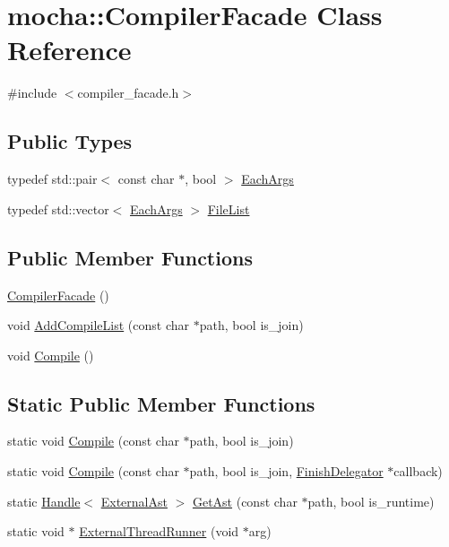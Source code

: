 \hypertarget{classmocha_1_1_compiler_facade}{
\section{mocha::CompilerFacade Class Reference}
\label{classmocha_1_1_compiler_facade}
}


{\ttfamily \#include $<$compiler\_\-facade.h$>$}

\subsection*{Public Types}
\begin{DoxyCompactItemize}
\item 
typedef std::pair$<$ const char $\ast$, bool $>$ \hyperlink{classmocha_1_1_compiler_facade_a22a27bcd738fd453a4da03982f96a080}{EachArgs}
\item 
typedef std::vector$<$ \hyperlink{classmocha_1_1_compiler_facade_a22a27bcd738fd453a4da03982f96a080}{EachArgs} $>$ \hyperlink{classmocha_1_1_compiler_facade_a8b5aaa05b5213622382bbd292a460461}{FileList}
\end{DoxyCompactItemize}
\subsection*{Public Member Functions}
\begin{DoxyCompactItemize}
\item 
\hyperlink{classmocha_1_1_compiler_facade_af1150ae9139adff6c7c4ceefd1aada2c}{CompilerFacade} ()
\item 
void \hyperlink{classmocha_1_1_compiler_facade_ae58b6ccb86e24b6e87b7d881463a71f0}{AddCompileList} (const char $\ast$path, bool is\_\-join)
\item 
void \hyperlink{classmocha_1_1_compiler_facade_a1d6fafdf125e45cd78ad1efd62c96df5}{Compile} ()
\end{DoxyCompactItemize}
\subsection*{Static Public Member Functions}
\begin{DoxyCompactItemize}
\item 
static void \hyperlink{classmocha_1_1_compiler_facade_a99c33f60447920c888b645a72c1f8dfa}{Compile} (const char $\ast$path, bool is\_\-join)
\item 
static void \hyperlink{classmocha_1_1_compiler_facade_a98c55b2a0409c4054049aae9d7766e4e}{Compile} (const char $\ast$path, bool is\_\-join, \hyperlink{classmocha_1_1_finish_delegator}{FinishDelegator} $\ast$callback)
\item 
static \hyperlink{classmocha_1_1_handle}{Handle}$<$ \hyperlink{classmocha_1_1_external_ast}{ExternalAst} $>$ \hyperlink{classmocha_1_1_compiler_facade_a53e5ad1b85d88f0a82099607242fcf86}{GetAst} (const char $\ast$path, bool is\_\-runtime)
\item 
static void $\ast$ \hyperlink{classmocha_1_1_compiler_facade_a6f4ae0de97286db3c2e2895b2ea1e0eb}{ExternalThreadRunner} (void $\ast$arg)
\end{DoxyCompactItemize}
